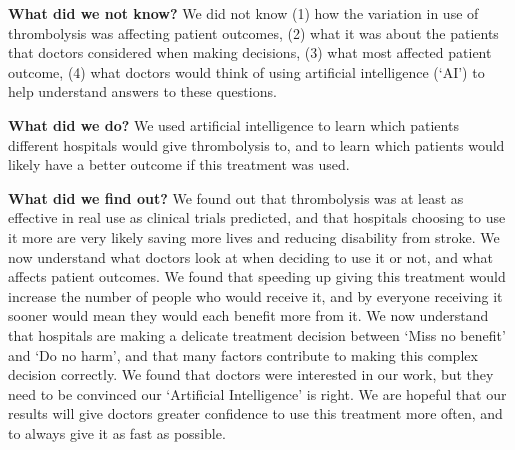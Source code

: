 \textbf{What did we not know?} We did not know (1) how the variation in use of thrombolysis was affecting patient outcomes, (2) what it was about the patients that doctors considered when making decisions, (3) what most affected patient outcome, (4) what doctors would think of using artificial intelligence (`AI') to help understand answers to these questions.

\textbf{What did we do?} We used artificial intelligence to learn which patients different hospitals would give thrombolysis to, and to learn which patients would likely have a better outcome if this treatment was used.

\textbf{What did we find out?} We found out that thrombolysis was at least as effective in real use as clinical trials predicted, and that hospitals choosing to use it more are very likely saving more lives and reducing disability from stroke. We now understand what doctors look at when deciding to use it or not, and what affects patient outcomes. We found that speeding up giving this treatment would increase the number of people who would receive it, and by everyone receiving it sooner would mean they would each benefit more from it. We now understand that hospitals are making a delicate treatment decision between ‘Miss no benefit’ and ‘Do no harm’, and that many factors contribute to making this complex decision correctly. We found that doctors were interested in our work, but they need to be convinced our ‘Artificial Intelligence’ is right. We are hopeful that our results will give doctors greater confidence to use this treatment more often, and to always give it as fast as possible.